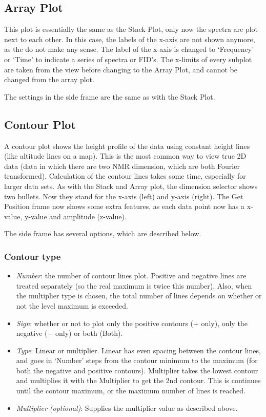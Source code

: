 \documentclass[11pt,a4paper]{article}
\begin{document}
\subsection{Array Plot}
This plot is essentially the same as the Stack Plot, only now the spectra are plot next to each other. In this case, the labels of the x-axis are
not shown anymore, as the do not make any sense. The label of the x-axis is changed to `Frequency' or `Time' to indicate a series of spectra or FID's.
The x-limits of every subplot are taken from the view before changing to the Array Plot, and cannot be changed from the array plot.

The settings in the side frame are the same as with the Stack Plot.


\subsection{Contour Plot}
A contour plot shows the height profile of the data using constant height lines (like altitude lines on a map). This is the most common way to view true 2D data
(data in which there are two NMR dimension, which are both Fourier transformed). Calculation of the contour lines takes some time, especially for larger data sets.
As with the Stack and Array plot, the dimension selector shows two bullets. Now they stand for the x-axis (left) and y-axis (right). The Get Position frame now shows some extra features,
as each data point now has a x-value, y-value and amplitude (z-value).

The side frame has several options, which are described below.

\subsubsection*{Contour type}
\begin{itemize}
  \item \textit{Number}: the number of contour lines plot. Positive and negative lines are treated separately (so the real maximum is twice this number). Also, when 
	 the multiplier type is chosen, the total number of lines depends on whether or not the level maximum is exceeded.
  \item \textit{Sign}: whether or not to plot only the positive contours (+ only), only the negative ($-$ only) or both (Both).
  \item \textit{Type}: Linear or multiplier. Linear has even spacing between the contour lines, and goes in `Number' steps from the contour minimum to the
	 maximum (for both the negative and positive contours). Multiplier takes the lowest contour and multiplies it with the Multiplier to get the 2nd contour. This is continues
	 until the contour maximum, or the maximum number of lines is reached.
  \item \textit{Multiplier (optional)}: Supplies the multiplier value as described above.
\end{itemize}
\end{document}
